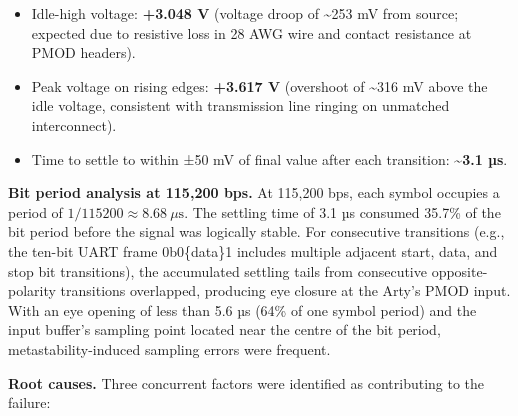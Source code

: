 \begin{itemize}
  \item Idle-high voltage: \textbf{+3.048 V} (voltage droop of \textasciitilde{}253 mV from source; expected due to resistive loss in 28 AWG wire and contact resistance at PMOD headers).
  \item Peak voltage on rising edges: \textbf{+3.617 V} (overshoot of \textasciitilde{}316 mV above the idle voltage, consistent with transmission line ringing on unmatched interconnect).
  \item Time to settle to within ±50 mV of final value after each transition: \textbf{\textasciitilde{}3.1 µs}.
\end{itemize}
\textbf{Bit period analysis at 115,200 bps.} At 115,200 bps, each symbol occupies a period of $1/115200 \approx 8.68\ \mu\text{s}$. The settling time of 3.1 µs consumed 35.7\% of the bit period before the signal was logically stable. For consecutive transitions (e.g., the ten-bit UART frame 0b0\{data\}1 includes multiple adjacent start, data, and stop bit transitions), the accumulated settling tails from consecutive opposite-polarity transitions overlapped, producing eye closure at the Arty's PMOD input. With an eye opening of less than 5.6 µs (64\% of one symbol period) and the input buffer's sampling point located near the centre of the bit period, metastability-induced sampling errors were frequent.

\textbf{Root causes.} Three concurrent factors were identified as contributing to the failure:

